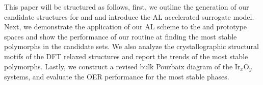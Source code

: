 
%
%
This paper will be structured as follows,
first, we outline the generation of our candidate structures for \IrOtwo and \IrOthree and introduce the AL accelerated surrogate model.
%
Next, we demonstrate the application of our AL scheme to the \IrOtwo and \IrOthree prototype spaces and show the performance of our routine at finding the most stable polymorphs in the candidate sets.
%
We also analyze the crystallographic structural motifs of the DFT relaxed structures and report the trends of the most stable polymorphs.
%
Lastly, we construct a revised bulk Pourbaix diagram of the Ir$_x$O$_y$ systems, and evaluate the OER performance for the most stable phases.
%
